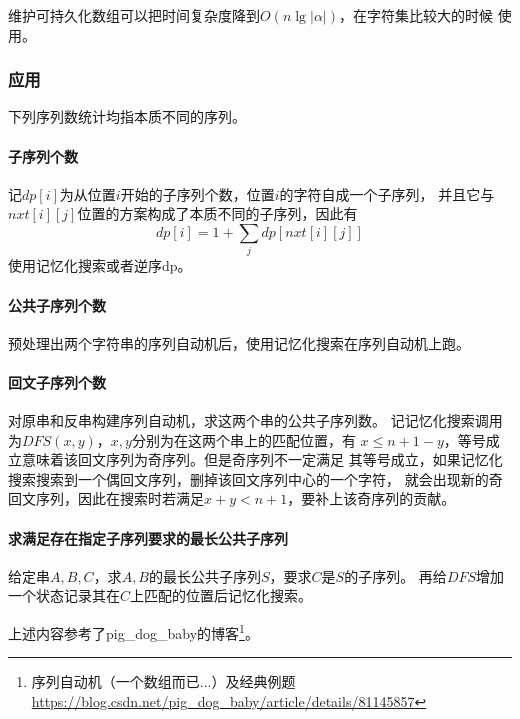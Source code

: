 维护可持久化数组可以把时间复杂度降到$O(n\lg |\alpha|)$，在字符集比较大的时候
使用。
\subsubsection{应用}
下列序列数统计均指本质不同的序列。
\paragraph{子序列个数}
记$dp[i]$为从位置$i$开始的子序列个数，位置$i$的字符自成一个子序列，
并且它与$nxt[i][j]$位置的方案构成了本质不同的子序列，因此有
\begin{displaymath}
    dp[i]=1+\sum_j{dp[nxt[i][j]]}
\end{displaymath}
使用记忆化搜索或者逆序dp。
\paragraph{公共子序列个数}
预处理出两个字符串的序列自动机后，使用记忆化搜索在序列自动机上跑。
\paragraph{回文子序列个数}
对原串和反串构建序列自动机，求这两个串的公共子序列数。
记记忆化搜索调用为$DFS(x,y)$，$x,y$分别为在这两个串上的匹配位置，有
$x\leq n+1-y$，等号成立意味着该回文序列为奇序列。但是奇序列不一定满足
其等号成立，如果记忆化搜索搜索到一个偶回文序列，删掉该回文序列中心的一个字符，
就会出现新的奇回文序列，因此在搜索时若满足$x+y<n+1$，要补上该奇序列的贡献。
\paragraph{求满足存在指定子序列要求的最长公共子序列}
给定串$A,B,C$，求$A,B$的最长公共子序列$S$，要求$C$是$S$的子序列。
再给$DFS$增加一个状态记录其在$C$上匹配的位置后记忆化搜索。

上述内容参考了pig\_dog\_baby的博客\footnote{
    序列自动机（一个数组而已...）及经典例题
    \url{https://blog.csdn.net/pig\_dog\_baby/article/details/81145857}
}。
